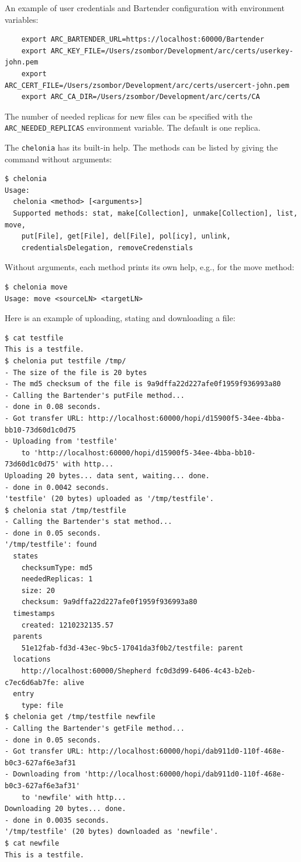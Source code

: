 \documentclass{book}
\begin{document}
An example of user credentials and Bartender configuration with environment variables:

\begin{verbatim}
    export ARC_BARTENDER_URL=https://localhost:60000/Bartender
    export ARC_KEY_FILE=/Users/zsombor/Development/arc/certs/userkey-john.pem
    export ARC_CERT_FILE=/Users/zsombor/Development/arc/certs/usercert-john.pem 
    export ARC_CA_DIR=/Users/zsombor/Development/arc/certs/CA    
\end{verbatim}

The number of needed replicas for new files can be specified with the \verb!ARC_NEEDED_REPLICAS! environment variable. The default is one replica.

The \verb!chelonia! has its built-in help. The methods can be listed by giving the command without arguments:

\begin{verbatim}
$ chelonia
Usage:
  chelonia <method> [<arguments>]
  Supported methods: stat, make[Collection], unmake[Collection], list, move,
    put[File], get[File], del[File], pol[icy], unlink,
    credentialsDelegation, removeCredenstials
\end{verbatim}
Without arguments, each method prints its own help, e.g., for the move method:
\begin{verbatim}
$ chelonia move
Usage: move <sourceLN> <targetLN>
\end{verbatim}

Here is an example of uploading, stating and downloading a file:

\begin{verbatim}
$ cat testfile 
This is a testfile.
$ chelonia put testfile /tmp/
- The size of the file is 20 bytes
- The md5 checksum of the file is 9a9dffa22d227afe0f1959f936993a80
- Calling the Bartender's putFile method...
- done in 0.08 seconds.
- Got transfer URL: http://localhost:60000/hopi/d15900f5-34ee-4bba-bb10-73d60d1c0d75
- Uploading from 'testfile'
    to 'http://localhost:60000/hopi/d15900f5-34ee-4bba-bb10-73d60d1c0d75' with http...
Uploading 20 bytes... data sent, waiting... done.
- done in 0.0042 seconds.
'testfile' (20 bytes) uploaded as '/tmp/testfile'.
$ chelonia stat /tmp/testfile
- Calling the Bartender's stat method...
- done in 0.05 seconds.
'/tmp/testfile': found
  states
    checksumType: md5
    neededReplicas: 1
    size: 20
    checksum: 9a9dffa22d227afe0f1959f936993a80
  timestamps
    created: 1210232135.57
  parents
    51e12fab-fd3d-43ec-9bc5-17041da3f0b2/testfile: parent
  locations
    http://localhost:60000/Shepherd fc0d3d99-6406-4c43-b2eb-c7ec6d6ab7fe: alive
  entry
    type: file
$ chelonia get /tmp/testfile newfile
- Calling the Bartender's getFile method...
- done in 0.05 seconds.
- Got transfer URL: http://localhost:60000/hopi/dab911d0-110f-468e-b0c3-627af6e3af31
- Downloading from 'http://localhost:60000/hopi/dab911d0-110f-468e-b0c3-627af6e3af31'
    to 'newfile' with http...
Downloading 20 bytes... done.
- done in 0.0035 seconds.
'/tmp/testfile' (20 bytes) downloaded as 'newfile'.
$ cat newfile 
This is a testfile.
\end{verbatim}
\end{document}

